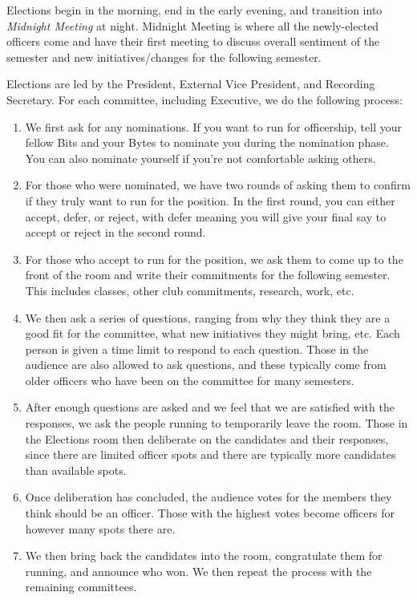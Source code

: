 \documentclass[11pt, article, oneside]{memoir}
\begin{document}
        Elections begin in the morning, end in the early evening, and transition into \emph{Midnight Meeting} at night. Midnight Meeting is where all the newly-elected officers come and have their first meeting to discuss overall sentiment of the semester and new initiatives/changes for the following semester.

        \bigbreak
        
        Elections are led by the President, External Vice President, and Recording Secretary. For each committee, including Executive, we do the following process:
        \begin{enumerate}
            \item We first ask for any nominations. If you want to run for officership, tell your fellow Bits and your Bytes to nominate you during the nomination phase. You can also nominate yourself if you're not comfortable asking others.
            \item For those who were nominated, we have two rounds of asking them to confirm if they truly want to run for the position. In the first round, you can either accept, defer, or reject, with defer meaning you will give your final say to accept or reject in the second round.
            \item For those who accept to run for the position, we ask them to come up to the front of the room and write their commitments for the following semester. This includes classes, other club commitments, research, work, etc. 
            \item We then ask a series of questions, ranging from why they think they are a good fit for the committee, what new initiatives they might bring, etc. Each person is given a time limit to respond to each question. Those in the audience are also allowed to ask questions, and these typically come from older officers who have been on the committee for many semesters.
            \item After enough questions are asked and we feel that we are satisfied with the responses, we ask the people running to temporarily leave the room. Those in the Elections room then deliberate on the candidates and their responses, since there are limited officer spots and there are typically more candidates than available spots.
            \item Once deliberation has concluded, the audience votes for the members they think should be an officer. Those with the highest votes become officers for however many spots there are.
            \item We then bring back the candidates into the room, congratulate them for running, and announce who won. We then repeat the process with the remaining committees.
        \end{enumerate}
\end{document}

